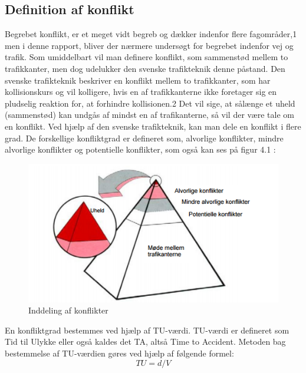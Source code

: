 \subsection{Definition af konflikt}
\label{sub:def_konflikt}
Begrebet konflikt, er et meget vidt begreb og dækker indenfor flere fagområder,1 men i denne rapport, bliver der nærmere undersøgt for begrebet indenfor vej og trafik. Som umiddelbart vil man definere konflikt, som sammenstød mellem to trafikkanter, men dog udelukker den svenske trafikteknik denne påstand. Den svenske trafikteknik beskriver en konflikt mellem to trafikkanter, som har kollisionskurs og vil kolligere, hvis en af trafikkanterne ikke foretager sig en pludselig reaktion for, at forhindre kollisionen.2 Det vil sige, at sålænge et uheld (sammenstød) kan undgås af mindst en af trafikanterne, så vil der være tale om en konflikt. Ved hjælp af den svenske trafikteknik, kan man dele en konflikt i flere grad. De forskellige konfliktgrad er defineret som, alvorlige konflikter, mindre alvorlige konflikter og potentielle konflikter, som også kan ses på figur 4.1 :
 \begin{figure}[htbp]
   \label{fig:indellingkonflikter}
   \centering
   \begin{adjustbox}{max width=\textwidth}
     \includegraphics{billederogfigur/konflikt.png} %
  \end{adjustbox}
   \caption{Inddeling af konflikter}
 \end{figure}
\newpage
 En konfliktgrad bestemmes ved hjælp af TU-værdi. TU-værdi er defineret som Tid til Ulykke eller også kaldes det TA, altså Time to Accident. Metoden bag bestemmelse af TU-værdien gøres ved hjælp af følgende formel:
 \begin{equation}
  TU=d/V
\end{equation}

